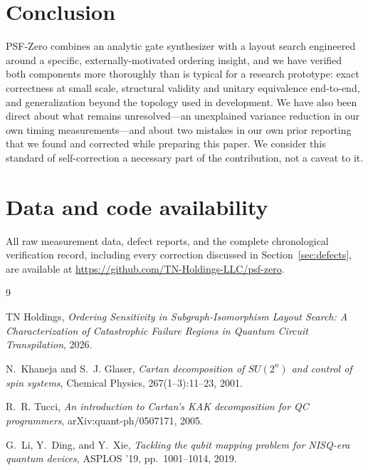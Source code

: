 \documentclass[11pt]{article}
\begin{document}
\section{Conclusion}

PSF-Zero combines an analytic gate synthesizer with a layout search
engineered around a specific, externally-motivated ordering insight,
and we have verified both components more thoroughly than is typical
for a research prototype: exact correctness at small scale, structural
validity and unitary equivalence end-to-end, and generalization beyond
the topology used in development. We have also been direct about what
remains unresolved---an unexplained variance reduction in our own
timing measurements---and about two mistakes in our own prior reporting
that we found and corrected while preparing this paper. We consider
this standard of self-correction a necessary part of the contribution,
not a caveat to it.

\section*{Data and code availability}

All raw measurement data, defect reports, and the complete
chronological verification record, including every correction
discussed in Section~\ref{sec:defects}, are available at
\url{https://github.com/TN-Holdings-LLC/psf-zero}.

\begin{thebibliography}{9}

TN Holdings,
\emph{Ordering Sensitivity in Subgraph-Isomorphism Layout Search: A
Characterization of Catastrophic Failure Regions in Quantum Circuit
Transpilation}, 2026.

N.~Khaneja and S.~J. Glaser,
\emph{Cartan decomposition of $SU(2^n)$ and control of spin systems},
Chemical Physics, 267(1--3):11--23, 2001.

R.~R. Tucci,
\emph{An introduction to Cartan's KAK decomposition for QC
programmers}, arXiv:quant-ph/0507171, 2005.

G.~Li, Y.~Ding, and Y.~Xie,
\emph{Tackling the qubit mapping problem for NISQ-era quantum devices},
ASPLOS '19, pp.~1001--1014, 2019.

\end{thebibliography}
\end{document}
